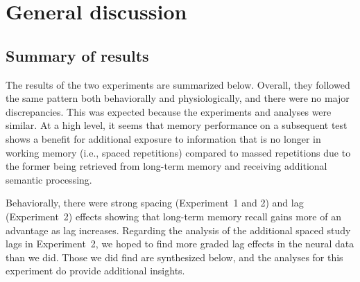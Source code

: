 
\chapter{General discussion}





\section{Summary of results}


The results of the two experiments are summarized below.  Overall, they followed the same pattern both behaviorally and physiologically, and there were no major discrepancies.  This was expected because the experiments and analyses were similar.  At a high level, it seems that memory performance on a subsequent test shows a benefit for additional exposure to information that is no longer in working memory (i.e., spaced repetitions) compared to massed repetitions due to the former being retrieved from long-term memory and receiving additional semantic processing.

Behaviorally, there were strong spacing (Experiment~1 and 2) and lag (Experiment~2) effects showing that long-term memory recall gains more of an advantage as lag increases.
Regarding the analysis of the additional spaced study lags in Experiment~2, we hoped to find more graded lag effects in the neural data than we did.  Those we did find are synthesized below, and the analyses for this experiment do provide additional insights.

